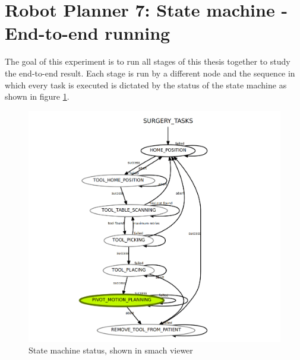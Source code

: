 \newpage
\section{Robot Planner 7: State machine - End-to-end running}
\label{section:robot-planner7}

The goal of this experiment is to run all stages of this thesis together to study the end-to-end result. Each stage is run by a different node and the sequence in which every task is executed is dictated by the status 
of the state machine as shown in figure \ref{smack-state-machine}.

\begin{center}
\begin{figure}[!htb]
\centering
\includegraphics[width=\textwidth]{images/state-machine-all-tasks.png}
\caption{State machine status, shown in smach viewer}
\label{smack-state-machine}
\end{figure}
\end{center}
